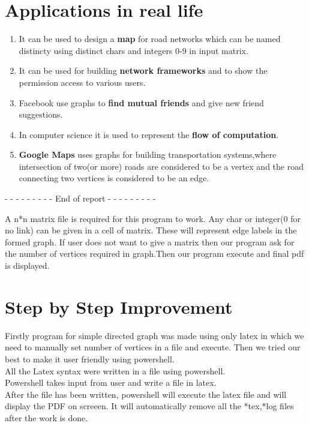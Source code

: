 \documentclass[12pt]{article}
\begin{document}
\section{Applications in real life}
\begin{enumerate}
\item{It can be used to design a \textbf{map} for road networks which can be named distincty using distinct chars and integers 0-9 in input matrix.}
\item{It can be used for building \textbf{network frameworks} and to show the permission access to various users.}
\item{Facebook use graphs to \textbf{find mutual friends} and give new friend suggestions. }
\item{In computer science it is used to represent the \textbf{flow of computation}.}
\item{\textbf{Google Maps} uses graphs for building transportation systems,where intersection of two(or more) roads are considered to be a vertex and the road connecting two vertices is considered to be an edge.}
\end{enumerate}
\quad
\quad
\begin{center}
\quad
\quad
- - - - - - - - - End of report - - - - - - - - -
\end{center}
A n*n matrix file is required for this program to work. Any char or integer(0 for no link) can be given in a cell of matrix. These will represent edge labels in the formed graph.
If user does not want to give a matrix then our program ask for the number of vertices required in graph.Then our program execute and final pdf is displayed.
\section{Step by Step Improvement}
Firstly program for simple directed graph was made using only latex in which we need to manually set number of vertices in a file and execute.
Then we tried our best to make it user friendly using powershell.\\
All the Latex syntax were written in a file using powershell.\\
Powershell takes input from user and write a file in latex.\\
After the file has been written, powershell will execute the latex file and will display the PDF on screeen.
It will automatically remove all the *tex,*log files after the work is done.





%
%
\end{document}
